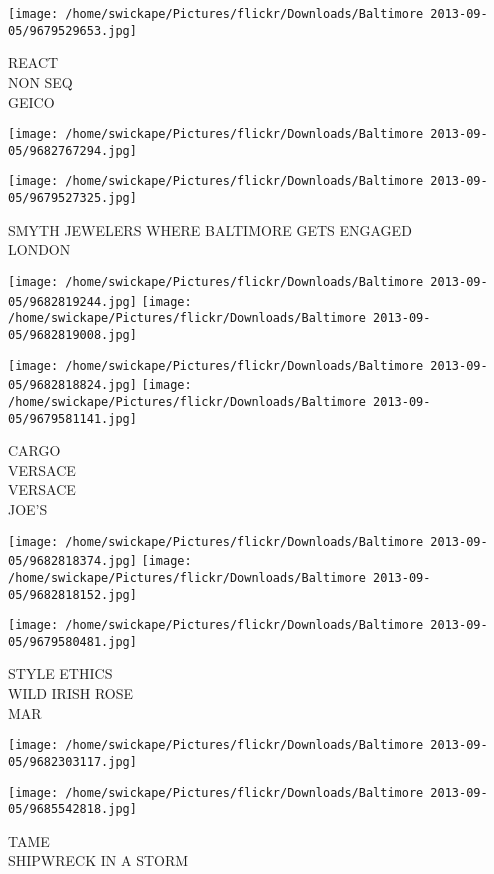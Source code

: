 \documentclass[10pt,letterpaper]{article}
\begin{document}
\vspace{0.25in}
\texttt{[image: /home/swickape/Pictures/flickr/Downloads/Baltimore 2013-09-05/9679529653.jpg]}

REACT\\
NON SEQ\\
GEICO
\pagebreak

\texttt{[image: /home/swickape/Pictures/flickr/Downloads/Baltimore 2013-09-05/9682767294.jpg]}

\vspace{0.25in}
\texttt{[image: /home/swickape/Pictures/flickr/Downloads/Baltimore 2013-09-05/9679527325.jpg]}

SMYTH JEWELERS WHERE BALTIMORE GETS ENGAGED\\
LONDON
\pagebreak

\texttt{[image: /home/swickape/Pictures/flickr/Downloads/Baltimore 2013-09-05/9682819244.jpg]}
\texttt{[image: /home/swickape/Pictures/flickr/Downloads/Baltimore 2013-09-05/9682819008.jpg]}

\texttt{[image: /home/swickape/Pictures/flickr/Downloads/Baltimore 2013-09-05/9682818824.jpg]}
\texttt{[image: /home/swickape/Pictures/flickr/Downloads/Baltimore 2013-09-05/9679581141.jpg]}

CARGO\\
VERSACE\\
VERSACE\\
JOE'S
\pagebreak

\texttt{[image: /home/swickape/Pictures/flickr/Downloads/Baltimore 2013-09-05/9682818374.jpg]}
\texttt{[image: /home/swickape/Pictures/flickr/Downloads/Baltimore 2013-09-05/9682818152.jpg]}

\texttt{[image: /home/swickape/Pictures/flickr/Downloads/Baltimore 2013-09-05/9679580481.jpg]}

STYLE ETHICS\\
WILD IRISH ROSE\\
MAR
\pagebreak

\texttt{[image: /home/swickape/Pictures/flickr/Downloads/Baltimore 2013-09-05/9682303117.jpg]}

\vspace{0.25in}
\texttt{[image: /home/swickape/Pictures/flickr/Downloads/Baltimore 2013-09-05/9685542818.jpg]}

TAME\\
SHIPWRECK IN A STORM
\pagebreak
\end{document}
